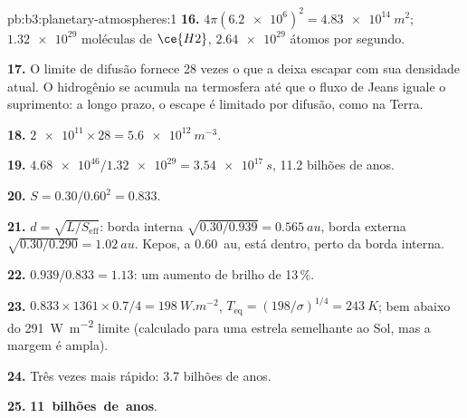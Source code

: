 \begin{solution}{pb:b3:planetary-atmospheres:1}
\textbf{16.} $4\pi(\num{6.2e6})^2 = \qty{4.83e14}{m^2}$; $\num{1.32e29}$ moléculas
de $\ce{H2}$, $\num{2.64e29}$ átomos por segundo.

\textbf{17.} O limite de difusão fornece 28 vezes o que a  deixa escapar com
sua densidade atual. O hidrogênio se acumula na termosfera até que o
fluxo de Jeans iguale o suprimento: a longo prazo, o escape é
limitado por difusão, como na Terra.

\textbf{18.} $\num{2e11}\times28 = \qty{5.6e12}{m^{-3}}$.

\textbf{19.} $\num{4.68e46}/\num{1.32e29} = \qty{3.54e17}{s}$, 11.2 bilhões de anos.

\textbf{20.} $S = 0.30/0.60^2 = 0.833$.

\textbf{21.} $d = \sqrt{L/S_\mathrm{eff}}$: borda interna $\sqrt{0.30/0.939} =
\qty{0.565}{au}$, borda externa $\sqrt{0.30/0.290} = \qty{1.02}{au}$. Kepos,
a \qty{0.60}{au}, está dentro, perto da borda interna.

\textbf{22.} $0.939/0.833 = 1.13$: um aumento de brilho de 13\,\%.

\textbf{23.} $0.833\times1361\times0.7/4 = \qty{198}{W.m^{-2}}$, $T_\mathrm{eq} =
(198/\sigma)^{1/4} = \qty{243}{K}$; bem abaixo do
\qty{291}{W.m^{-2}} limite (calculado para uma estrela semelhante ao Sol, mas a margem
é ampla).

\textbf{24.} Três vezes mais rápido: 3.7 bilhões de anos.

\textbf{25.} \textbf{11~bilhões~de~anos}.
\end{solution}
